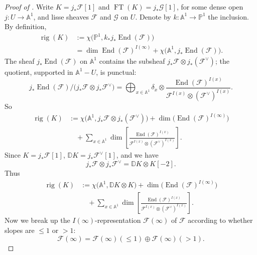 \begin{proof}[Proof of \chthreethmthreezerothree]
Write \(K=j_*\mathcal{F}[1]\) and
\(\operatorname{FT}(K)=j_*\mathcal{G}[1]\), for some dense open
\(j:U\to\mathbb{A}^1\), and lisse sheaves \(\mathcal{F}\) and
\(\mathcal{G}\) on \(U\). Denote by
\(k:\mathbb{A}^1\to\mathbb{P}^1\) the inclusion. By definition,
\[
\begin{aligned}
  \operatorname{rig}(K)
  &:= \chi\bigl(\mathbb{P}^1,k_*j_*\operatorname{End}(\mathcal{F})\bigr) \\
  &= \dim \operatorname{End}(\mathcal{F})^{I(\infty)}
     + \chi\bigl(\mathbb{A}^1,j_*\operatorname{End}(\mathcal{F})\bigr).
\end{aligned}
\]
The sheaf \(j_*\operatorname{End}(\mathcal{F})\) on \(\mathbb{A}^1\)
contains the subsheaf \(j_*\mathcal{F}\otimes j_*(\mathcal{F}^{\vee})\);
the quotient, supported in \(\mathbb{A}^1-U\), is punctual:
\[
  j_*\operatorname{End}(\mathcal{F})
  \big/
  \bigl(j_*\mathcal{F}\otimes j_*\mathcal{F}^{\vee}\bigr)
  =
  \bigoplus_{x\in\mathbb{A}^1}
  \delta_x\otimes
  \frac{\operatorname{End}(\mathcal{F})^{I(x)}}
       {\mathcal{F}^{I(x)}\otimes(\mathcal{F}^{\vee})^{I(x)}}.
\]
So
\[
\begin{aligned}
  \operatorname{rig}(K)
  &:= \chi\bigl(\mathbb{A}^1,j_*\mathcal{F}\otimes
       j_*(\mathcal{F}^{\vee})\bigr)
     + \dim\bigl(\operatorname{End}(\mathcal{F})^{I(\infty)}\bigr) \\
  &\quad
     + \sum_{x\in\mathbb{A}^1}
       \dim\left[
       \frac{\operatorname{End}(\mathcal{F})^{I(x)}}
            {\mathcal{F}^{I(x)}\otimes(\mathcal{F}^{\vee})^{I(x)}}\right].
\end{aligned}
\]
Since \(K=j_*\mathcal{F}[1]\), \(\mathbb{D}K=j_*\mathcal{F}^{\vee}[1]\),
and we have
\[
  j_*\mathcal{F}\otimes j_*\mathcal{F}^{\vee}
  =
  \mathbb{D}K\otimes K[-2].
\]
Thus
\[
\begin{aligned}
  \operatorname{rig}(K)
  &:= \chi\bigl(\mathbb{A}^1,\mathbb{D}K\otimes K\bigr)
     + \dim\bigl(\operatorname{End}(\mathcal{F})^{I(\infty)}\bigr) \\
  &\quad
     + \sum_{x\in\mathbb{A}^1}
       \dim\left[
       \frac{\operatorname{End}(\mathcal{F})^{I(x)}}
            {\mathcal{F}^{I(x)}\otimes(\mathcal{F}^{\vee})^{I(x)}}\right].
\end{aligned}
\]
Now we break up the \(I(\infty)\)-representation \(\mathcal{F}(\infty)\)
of \(\mathcal{F}\) according to whether slopes are \(\leq 1\) or \(>1\):
\[
  \mathcal{F}(\infty)
  =
  \mathcal{F}(\infty)(\leq 1)\oplus\mathcal{F}(\infty)(>1).
\]
\end{proof}
